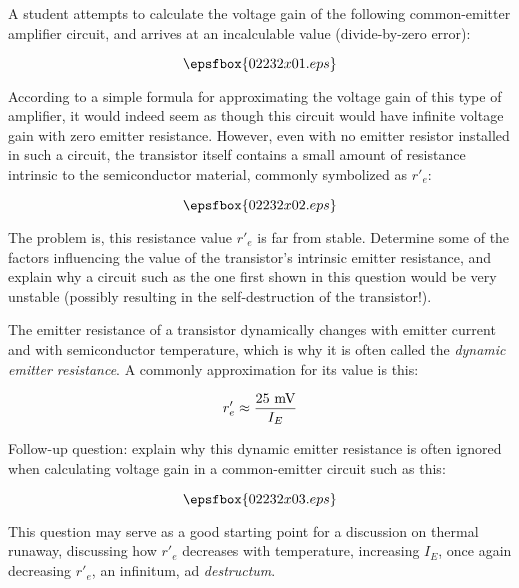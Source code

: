 

A student attempts to calculate the voltage gain of the following common-emitter amplifier circuit, and arrives at an incalculable value (divide-by-zero error):

$$\epsfbox{02232x01.eps}$$

According to a simple formula for approximating the voltage gain of this type of amplifier, it would indeed seem as though this circuit would have infinite voltage gain with zero emitter resistance.  However, even with no emitter resistor installed in such a circuit, the transistor itself contains a small amount of resistance intrinsic to the semiconductor material, commonly symbolized as $r'_e$:

$$\epsfbox{02232x02.eps}$$

The problem is, this resistance value $r'_e$ is far from stable.  Determine some of the factors influencing the value of the transistor's intrinsic emitter resistance, and explain why a circuit such as the one first shown in this question would be very unstable (possibly resulting in the self-destruction of the transistor!).







The emitter resistance of a transistor dynamically changes with emitter current and with semiconductor temperature, which is why it is often called the {\it dynamic emitter resistance}.  A commonly approximation for its value is this:

$$r'_e \approx {\hbox{25 mV} \over I_E}$$

\vskip 10pt

Follow-up question: explain why this dynamic emitter resistance is often ignored when calculating voltage gain in a common-emitter circuit such as this:

$$\epsfbox{02232x03.eps}$$







This question may serve as a good starting point for a discussion on thermal runaway, discussing how $r'_e$ decreases with temperature, increasing $I_E$, once again decreasing $r'_e$, an infinitum, ad {\it destructum}.

